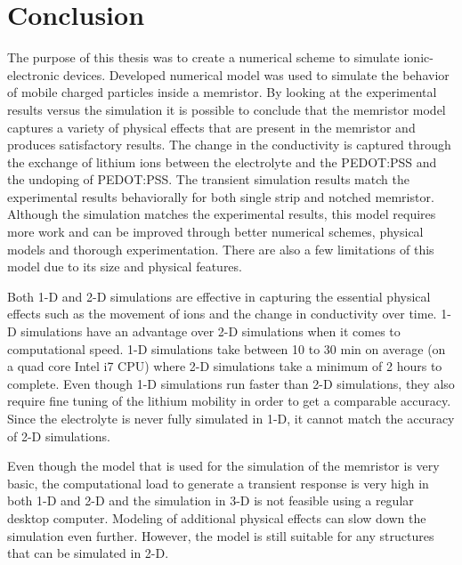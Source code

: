 
\chapter{Conclusion} %

\label{Chapter8} %


\begin{doublespace}

The purpose of this thesis was to create a numerical scheme to simulate ionic-electronic devices. Developed numerical model was used to simulate the behavior of mobile charged particles inside a memristor. By looking at the experimental results versus the simulation it is possible to conclude that the memristor model captures a variety of physical effects that are present in the memristor and produces satisfactory results. The change in the conductivity is captured through the exchange of lithium ions between the electrolyte and the PEDOT:PSS and the undoping of PEDOT:PSS. The transient simulation results match the experimental results behaviorally for both single strip and notched memristor. Although the simulation matches the experimental results, this model requires more work and can be improved through better numerical schemes, physical models and thorough experimentation. There are also a few limitations of this model due to its size and physical features.

Both 1-D and 2-D simulations are effective in capturing the essential physical effects such as the movement of ions and the change in conductivity over time. 1-D simulations have an advantage over 2-D simulations when it comes to computational speed. 1-D simulations take between 10 to 30 min on average (on a quad core Intel i7 CPU) where 2-D simulations take a minimum of 2 hours to complete. Even though 1-D simulations run faster than 2-D simulations, they also require fine tuning of the lithium mobility in order to get a comparable accuracy. Since the electrolyte is never fully simulated in 1-D, it cannot match the accuracy of 2-D simulations.

Even though the model that is used for the simulation of the memristor is very basic, the computational load to generate a transient response is very high in both 1-D and 2-D and the simulation in 3-D is not feasible using a regular desktop computer. Modeling of additional physical effects can slow down the simulation even further. However, the model is still suitable for any structures that can be simulated in 2-D.  


\end{doublespace}
